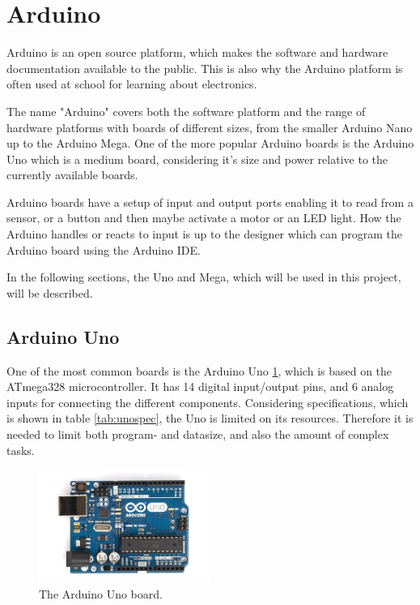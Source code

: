 \section{Arduino}\label{sec:arduino}
Arduino is an open source platform, which makes the software and hardware documentation available to the public. This is also why the Arduino platform is often used at school for learning about electronics.

The name "Arduino" covers both the software platform and the range of hardware platforms with boards of different sizes, from the smaller Arduino Nano up to the Arduino Mega. One of the more popular Arduino boards is the Arduino Uno which is a medium board, considering it's size and power relative to the currently available boards.

Arduino boards have a setup  of input and output ports enabling it to read from a sensor, or a button and then maybe activate a motor or an LED light. How the Arduino handles or reacts to input is up to the designer which can program the Arduino board using the Arduino IDE.

In the following sections, the Uno and Mega, which will be used in this project, will be described.

\subsection{Arduino Uno}
One of the most common boards is the Arduino Uno \ref{fig:arduinouno}, which is based on the ATmega328 microcontroller. It has 14 digital input/output pins, and 6 analog inputs for connecting the different components. Considering specifications, which is shown in table \ref{tab:unospec}, the Uno is limited on its resources. Therefore it is needed to limit both program- and datasize, and also the amount of complex tasks.

\begin{figure}[h!]
\centering
\includegraphics[width=0.5\textwidth]{chapters/analysis/figs/ArduinoUno.jpg}
\caption{The Arduino Uno board\cite{arduinointroduction}.}
\label{fig:arduinouno}
\end{figure}

